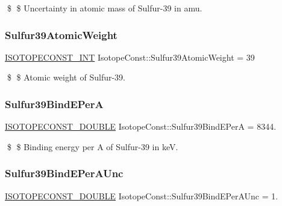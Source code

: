 \$ \$ Uncertainty in atomic mass of Sulfur-\/39 in amu. \mbox{\label{group___isotope_const-_sulfur-_s39_ga3495adf9048aa1d3ed196f6c96df5384}} 
\subsubsection{\texorpdfstring{Sulfur39\+Atomic\+Weight}{Sulfur39AtomicWeight}}
{\footnotesize\ttfamily \mbox{\hyperlink{group___isotope_const-_macros_ga5f18360b3e99483a35c32d789e62621c}{I\+S\+O\+T\+O\+P\+E\+C\+O\+N\+S\+T\+\_\+\+I\+NT}} Isotope\+Const\+::\+Sulfur39\+Atomic\+Weight = 39}

\$ \$ Atomic weight of Sulfur-\/39. \mbox{\label{group___isotope_const-_sulfur-_s39_gaa8b2d7bc30533ee6aca1ad24bab4d1c2}} 
\subsubsection{\texorpdfstring{Sulfur39\+Bind\+E\+PerA}{Sulfur39BindEPerA}}
{\footnotesize\ttfamily \mbox{\hyperlink{group___isotope_const-_macros_ga8f45a7272ce02c0b4c65c44636ed719a}{I\+S\+O\+T\+O\+P\+E\+C\+O\+N\+S\+T\+\_\+\+D\+O\+U\+B\+LE}} Isotope\+Const\+::\+Sulfur39\+Bind\+E\+PerA = 8344.}

\$ \$ Binding energy per A of Sulfur-\/39 in keV. \mbox{\label{group___isotope_const-_sulfur-_s39_gacc1555cddd95456e26b28a15fe8ea0c4}} 
\subsubsection{\texorpdfstring{Sulfur39\+Bind\+E\+Per\+A\+Unc}{Sulfur39BindEPerAUnc}}
{\footnotesize\ttfamily \mbox{\hyperlink{group___isotope_const-_macros_ga8f45a7272ce02c0b4c65c44636ed719a}{I\+S\+O\+T\+O\+P\+E\+C\+O\+N\+S\+T\+\_\+\+D\+O\+U\+B\+LE}} Isotope\+Const\+::\+Sulfur39\+Bind\+E\+Per\+A\+Unc = 1.}

